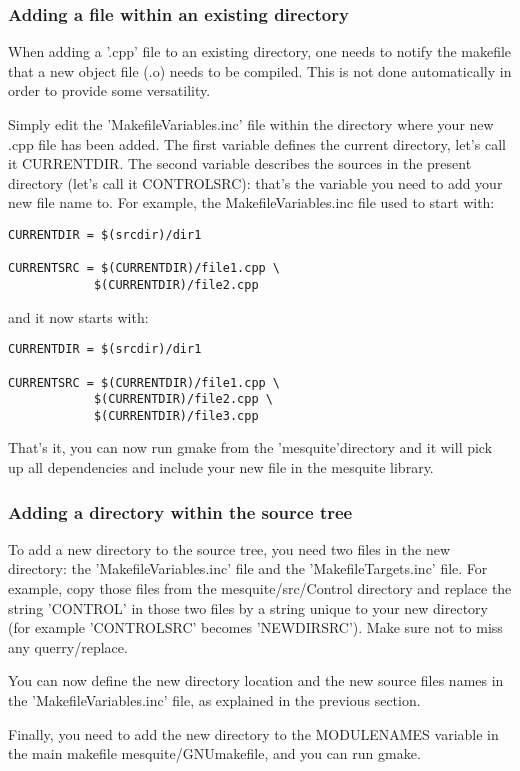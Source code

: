 \subsubsection{Adding a file within an existing directory}

When adding a '.cpp' file to an existing directory,  one needs to notify the makefile that a new
object file (.o) needs to be compiled. This is not done automatically in order to provide some
versatility.

Simply edit the 'MakefileVariables.inc' file within the directory where your new .cpp file has been added. The first
variable defines the current directory, let's call it CURRENTDIR. The second variable describes the
sources in the present directory (let's call it CONTROLSRC): that's the variable you need to add
your new file name to. For example, the MakefileVariables.inc file used to start with: 
\begin{verbatim}
CURRENTDIR = $(srcdir)/dir1

CURRENTSRC = $(CURRENTDIR)/file1.cpp \
            $(CURRENTDIR)/file2.cpp
\end{verbatim}
and it now starts with:
\begin{verbatim}
CURRENTDIR = $(srcdir)/dir1

CURRENTSRC = $(CURRENTDIR)/file1.cpp \
            $(CURRENTDIR)/file2.cpp \
            $(CURRENTDIR)/file3.cpp
\end{verbatim}
That's it, you can now run gmake from the 'mesquite'directory 
and it will pick up all dependencies and include your new file in
the mesquite library.

\subsubsection{Adding a directory within the source tree}

To add a new directory to the source tree, you need two files 
in the new directory: the 'MakefileVariables.inc' file and
 the 'MakefileTargets.inc' file. For example, copy those files from 
 the mesquite/src/Control directory and replace the string 'CONTROL' in 
those two files by a string unique to your new directory (for example 
'CONTROLSRC' becomes 'NEWDIRSRC'). Make sure not to miss any querry/replace.

You can now define the new directory location and the new source files 
names in the 'MakefileVariables.inc' file, as explained in the 
previous section.

Finally, you need to add the new directory to the MODULENAMES variable in the main makefile
mesquite/GNUmakefile, and you can run gmake. 

